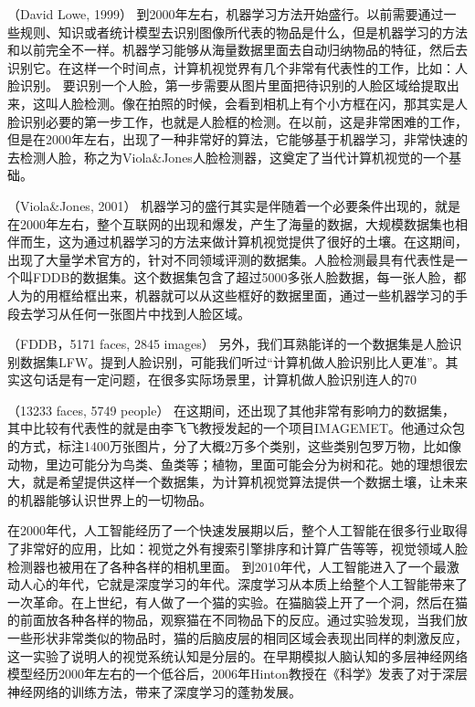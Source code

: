 （David Lowe, 1999）
到2000年左右，机器学习方法开始盛行。以前需要通过一些规则、知识或者统计模型去识别图像所代表的物品是什么，但是机器学习的方法和以前完全不一样。机器学习能够从海量数据里面去自动归纳物品的特征，然后去识别它。在这样一个时间点，计算机视觉界有几个非常有代表性的工作，比如：人脸识别。
要识别一个人脸，第一步需要从图片里面把待识别的人脸区域给提取出来，这叫人脸检测。像在拍照的时候，会看到相机上有个小方框在闪，那其实是人脸识别必要的第一步工作，也就是人脸框的检测。在以前，这是非常困难的工作，但是在2000年左右，出现了一种非常好的算法，它能够基于机器学习，非常快速的去检测人脸，称之为Viola&Jones人脸检测器，这奠定了当代计算机视觉的一个基础。

（Viola&Jones, 2001）
机器学习的盛行其实是伴随着一个必要条件出现的，就是在2000年左右，整个互联网的出现和爆发，产生了海量的数据，大规模数据集也相伴而生，这为通过机器学习的方法来做计算机视觉提供了很好的土壤。在这期间，出现了大量学术官方的，针对不同领域评测的数据集。人脸检测最具有代表性是一个叫FDDB的数据集。这个数据集包含了超过5000多张人脸数据，每一张人脸，都人为的用框给框出来，机器就可以从这些框好的数据里面，通过一些机器学习的手段去学习从任何一张图片中找到人脸区域。

（FDDB，5171 faces, 2845 images）
另外，我们耳熟能详的一个数据集是人脸识别数据集LFW。提到人脸识别，可能我们听过“计算机做人脸识别比人更准”。其实这句话是有一定问题，在很多实际场景里，计算机做人脸识别连人的70%

（13233 faces, 5749 people）
在这期间，还出现了其他非常有影响力的数据集，其中比较有代表性的就是由李飞飞教授发起的一个项目IMAGEMET。他通过众包的方式，标注1400万张图片，分了大概2万多个类别，这些类别包罗万物，比如像动物，里边可能分为鸟类、鱼类等；植物，里面可能会分为树和花。她的理想很宏大，就是希望提供这样一个数据集，为计算机视觉算法提供一个数据土壤，让未来的机器能够认识世界上的一切物品。

在2000年代，人工智能经历了一个快速发展期以后，整个人工智能在很多行业取得了非常好的应用，比如：视觉之外有搜索引擎排序和计算广告等等，视觉领域人脸检测器也被用在了各种各样的相机里面。
到2010年代，人工智能进入了一个最激动人心的年代，它就是深度学习的年代。深度学习从本质上给整个人工智能带来了一次革命。在上世纪，有人做了一个猫的实验。在猫脑袋上开了一个洞，然后在猫的前面放各种各样的物品，观察猫在不同物品下的反应。通过实验发现，当我们放一些形状非常类似的物品时，猫的后脑皮层的相同区域会表现出同样的刺激反应，这一实验了说明人的视觉系统认知是分层的。在早期模拟人脑认知的多层神经网络模型经历2000年左右的一个低谷后，2006年Hinton教授在《科学》发表了对于深层神经网络的训练方法，带来了深度学习的蓬勃发展。

